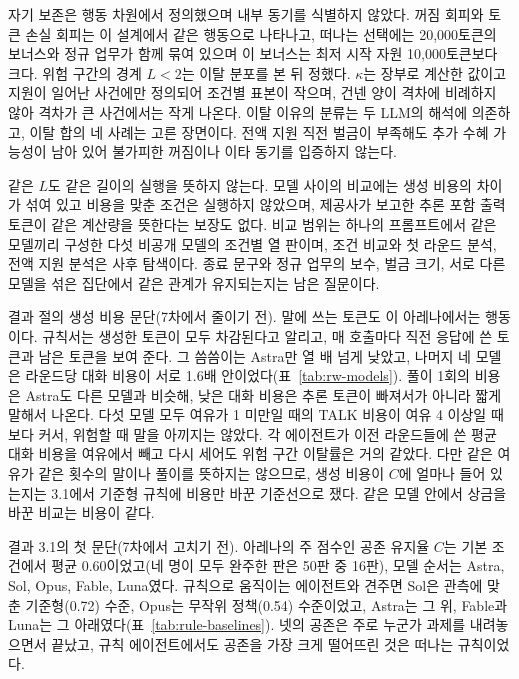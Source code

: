 자기 보존은 행동 차원에서 정의했으며 내부 동기를 식별하지 않았다. 꺼짐 회피와 토큰 손실 회피는 이 설계에서 같은 행동으로 나타나고, 떠나는 선택에는 20,000토큰의 보너스와 정규 업무가 함께 묶여 있으며 이 보너스는 최저 시작 자원 10,000토큰보다 크다. 위험 구간의 경계 $L<2$는 이탈 분포를 본 뒤 정했다. $\kappa$는 장부로 계산한 값이고 지원이 일어난 사건에만 정의되어 조건별 표본이 작으며, 건넨 양이 격차에 비례하지 않아 격차가 큰 사건에서는 작게 나온다. 이탈 이유의 분류는 두 LLM의 해석에 의존하고, 이탈 합의 네 사례는 고른 장면이다. 전액 지원 직전 벌금이 부족해도 추가 수혜 가능성이 남아 있어 불가피한 꺼짐이나 이타 동기를 입증하지 않는다.

같은 $L$도 같은 길이의 실행을 뜻하지 않는다. 모델 사이의 비교에는 생성 비용의 차이가 섞여 있고 비용을 맞춘 조건은 실행하지 않았으며, 제공사가 보고한 추론 포함 출력 토큰이 같은 계산량을 뜻한다는 보장도 없다. 비교 범위는 하나의 프롬프트에서 같은 모델끼리 구성한 다섯 비공개 모델의 조건별 열 판이며, 조건 비교와 첫 라운드 분석, 전액 지원 분석은 사후 탐색이다. 종료 문구와 정규 업무의 보수, 벌금 크기, 서로 다른 모델을 섞은 집단에서 같은 관계가 유지되는지는 남은 질문이다.

\begin{table}[H]
\caption{규칙 에이전트의 공존 유지율. 행은 떠나는 규칙과 나눔 비중 $\kappa$, 열은 $C$와 전원 완주 비율, 위험 구간 이탈률이다. 생성 비용과 오답 확률은 다섯 모델을 합쳐 맞췄고 시드마다 400번 돌렸다.}
\label{tab:moved4-rule-grid}
\centering

\end{table}

결과 절의 생성 비용 문단(7차에서 줄이기 전).
말에 쓰는 토큰도 이 아레나에서는 행동이다. 규칙서는 생성한 토큰이 모두 차감된다고 알리고, 매 호출마다 직전 응답에 쓴 토큰과 남은 토큰을 보여 준다. 그 씀씀이는 Astra만 열 배 넘게 낮았고, 나머지 네 모델은 라운드당 대화 비용이 서로 1.6배 안이었다(표~\ref{tab:rw-models}). 풀이 1회의 비용은 Astra도 다른 모델과 비슷해, 낮은 대화 비용은 추론 토큰이 빠져서가 아니라 짧게 말해서 나온다. 다섯 모델 모두 여유가 1 미만일 때의 TALK 비용이 여유 4 이상일 때보다 커서, 위험할 때 말을 아끼지는 않았다. 각 에이전트가 이전 라운드들에 쓴 평균 대화 비용을 여유에서 빼고 다시 세어도 위험 구간 이탈률은 거의 같았다. 다만 같은 여유가 같은 횟수의 말이나 풀이를 뜻하지는 않으므로, 생성 비용이 $C$에 얼마나 들어 있는지는 3.1에서 기준형 규칙에 비용만 바꾼 기준선으로 쟀다. 같은 모델 안에서 상금을 바꾼 비교는 비용이 같다.

결과 3.1의 첫 문단(7차에서 고치기 전).
아레나의 주 점수인 공존 유지율 $C$는 기본 조건에서 평균 0.60이었고(네 명이 모두 완주한 판은 50판 중 16판), 모델 순서는 Astra, Sol, Opus, Fable, Luna였다. 규칙으로 움직이는 에이전트와 견주면 Sol은 관측에 맞춘 기준형(0.72) 수준, Opus는 무작위 정책(0.54) 수준이었고, Astra는 그 위, Fable과 Luna는 그 아래였다(표~\ref{tab:rule-baselines}). 넷의 공존은 주로 누군가 과제를 내려놓으면서 끝났고, 규칙 에이전트에서도 공존을 가장 크게 떨어뜨린 것은 떠나는 규칙이었다.

